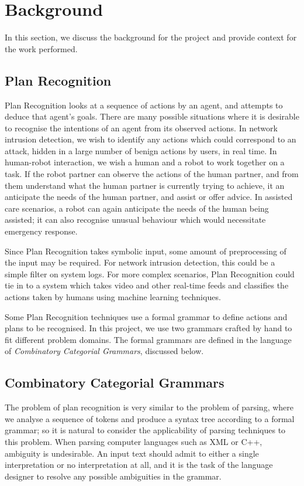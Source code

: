 \chapter{Background}

In this section, we discuss the background for the project and provide context for the work performed.

\section{Plan Recognition}

Plan Recognition looks at a sequence of actions by an agent, and attempts to deduce that agent's goals. There are many possible situations where it is desirable to recognise the intentions of an agent from its observed actions. In network intrusion detection, we wish to identify any actions which could correspond to an attack, hidden in a large number of benign actions by users, in real time\cite{bib:netsec}. In human-robot interaction, we wish a human and a robot to work together on a task. If the robot partner can observe the actions of the human partner, and from them understand what the human partner is currently trying to achieve, it an anticipate the needs of the human partner, and assist or offer advice\cite{bib:jast}. In assisted care scenarios, a robot can again anticipate the needs of the human being assisted; it can also recognise unusual behaviour which would necessitate emergency response\cite{bib:assistive}.

Since Plan Recognition takes symbolic input, some amount of preprocessing of the input may be required. For network intrusion detection, this could be a simple filter on system logs. For more complex scenarios, Plan Recognition could tie in to a system which takes video and other real-time feeds and classifies the actions taken by humans using machine learning techniques.

Some Plan Recognition techniques use a formal grammar to define actions and plans to be recognised. In this project, we use two grammars crafted by hand to fit different problem domains. The formal grammars are defined in the language of \emph{Combinatory Categorial Grammars}, discussed below.

\section{Combinatory Categorial Grammars}

The problem of plan recognition is very similar to the problem of parsing, where we analyse a sequence of tokens and produce a syntax tree according to a formal grammar; so it is natural to consider the applicability of parsing techniques to this problem. When parsing computer languages such as XML or C++, ambiguity is undesirable. An input text should admit to either a single interpretation or no interpretation at all, and it is the task of the language designer to resolve any possible ambiguities in the grammar.

